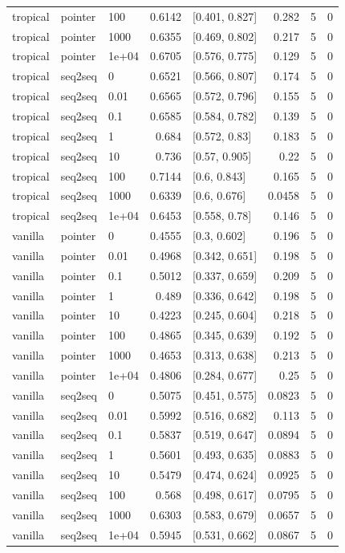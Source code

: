 \documentclass[10pt]{article}
\begin{document}
{\begin{longtable}{lllrlrrr}
tropical & pointer & 100 & 0.6142 & [0.401, 0.827] & 0.282 & 5 & 0\\
tropical & pointer & 1000 & 0.6355 & [0.469, 0.802] & 0.217 & 5 & 0\\
tropical & pointer & 1e+04 & 0.6705 & [0.576, 0.775] & 0.129 & 5 & 0\\
tropical & seq2seq & 0 & 0.6521 & [0.566, 0.807] & 0.174 & 5 & 0\\
tropical & seq2seq & 0.01 & 0.6565 & [0.572, 0.796] & 0.155 & 5 & 0\\
tropical & seq2seq & 0.1 & 0.6585 & [0.584, 0.782] & 0.139 & 5 & 0\\
tropical & seq2seq & 1 & 0.684 & [0.572, 0.83] & 0.183 & 5 & 0\\
tropical & seq2seq & 10 & 0.736 & [0.57, 0.905] & 0.22 & 5 & 0\\
tropical & seq2seq & 100 & 0.7144 & [0.6, 0.843] & 0.165 & 5 & 0\\
tropical & seq2seq & 1000 & 0.6339 & [0.6, 0.676] & 0.0458 & 5 & 0\\
tropical & seq2seq & 1e+04 & 0.6453 & [0.558, 0.78] & 0.146 & 5 & 0\\
vanilla & pointer & 0 & 0.4555 & [0.3, 0.602] & 0.196 & 5 & 0\\
vanilla & pointer & 0.01 & 0.4968 & [0.342, 0.651] & 0.198 & 5 & 0\\
vanilla & pointer & 0.1 & 0.5012 & [0.337, 0.659] & 0.209 & 5 & 0\\
vanilla & pointer & 1 & 0.489 & [0.336, 0.642] & 0.198 & 5 & 0\\
vanilla & pointer & 10 & 0.4223 & [0.245, 0.604] & 0.218 & 5 & 0\\
vanilla & pointer & 100 & 0.4865 & [0.345, 0.639] & 0.192 & 5 & 0\\
vanilla & pointer & 1000 & 0.4653 & [0.313, 0.638] & 0.213 & 5 & 0\\
vanilla & pointer & 1e+04 & 0.4806 & [0.284, 0.677] & 0.25 & 5 & 0\\
vanilla & seq2seq & 0 & 0.5075 & [0.451, 0.575] & 0.0823 & 5 & 0\\
vanilla & seq2seq & 0.01 & 0.5992 & [0.516, 0.682] & 0.113 & 5 & 0\\
vanilla & seq2seq & 0.1 & 0.5837 & [0.519, 0.647] & 0.0894 & 5 & 0\\
vanilla & seq2seq & 1 & 0.5601 & [0.493, 0.635] & 0.0883 & 5 & 0\\
vanilla & seq2seq & 10 & 0.5479 & [0.474, 0.624] & 0.0925 & 5 & 0\\
vanilla & seq2seq & 100 & 0.568 & [0.498, 0.617] & 0.0795 & 5 & 0\\
vanilla & seq2seq & 1000 & 0.6303 & [0.583, 0.679] & 0.0657 & 5 & 0\\
vanilla & seq2seq & 1e+04 & 0.5945 & [0.531, 0.662] & 0.0867 & 5 & 0\\
\bottomrule
\end{longtable}
}
\end{document}
